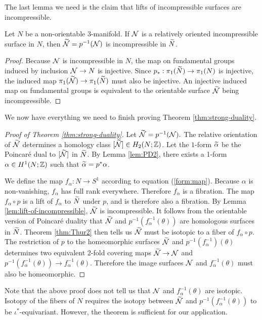 The last lemma we need is the claim that lifts of incompressible surfaces are incompressible.
\begin{lem}
  \label{lem:lift-of-incompressible}
  Let $N$ be a non-orientable 3-manifold.  If $\mathcal{N}$ is a relatively oriented incompressible surface in $N$, then $\widetilde{\mathcal{N}}=p^{-1}(\mathcal{N})$ is incompressible in $\widetilde{N}$.
\end{lem}
\begin{proof}
  Because $\mathcal{N}$ is incompressible in $N$, the map on fundamental groups induced by inclusion $\mathcal{N}\rightarrow N$ is injective.
  Since $p_\ast:\pi_1(\widetilde{N})\rightarrow\pi_1(N)$ is injective, the induced map $\pi_1(\widetilde{\mathcal{N}}) \to \pi_1(\widetilde{N})$ must also be injective.  An injective induced map on fundamental groups is equivalent to the orientable surface $\widetilde{\mathcal{N}}$ being incompressible.
\end{proof}


We now have everything we need to finish proving Theorem \ref{thm:strong-duality}.
\begin{proof}[Proof of Theorem \ref{thm:strong-duality}]
  Let $\widetilde{\mathcal{N}}=p^{-1}(\mathcal{N}).$
  The relative orientation of $\widetilde{\mathcal{N}}$ determines a homology class $[\widetilde{\mathcal{N}}]\in H_2(N;\mathbb{Z})$.  Let the $1$-form $\widetilde{\alpha}$ be the Poincar\'e dual to $[\widetilde{\mathcal{N}}]$ in $\widetilde{N}$.
  By Lemma \ref{lem:PD2}, there exists a 1-form $\alpha\in H^1(N;\mathbb{Z})$ such that $\widetilde{\alpha}=p^\ast\alpha$.

We define the map $f_\alpha:N\rightarrow S^1$ according to equation (\ref{form:map}).  Because $\alpha$ is non-vanishing, $f_{\alpha}$ has full rank everywhere.  Therefore $f_\alpha$ is a fibration.
The map $f_{\alpha} \circ p$ is a lift of $f_{\alpha}$ to $\widetilde{N}$ under $p$, and is therefore also a fibration.
  By Lemma \ref{lem:lift-of-incompressible}, $\widetilde{\mathcal{N}}$ is incompressible.
It follows from the orientable version of Poincar\'e duality that $\widetilde{\mathcal{N}}$ and $p^{-1}(f_{\alpha}^{-1}(\theta))$ are homologous surfaces in $\widetilde{N}$.    Theorem \ref{thm:Thur2} then tells us $\widetilde{\mathcal{N}}$ must be isotopic to a fiber of $f_{\alpha} \circ p$.
  The restriction of $p$ to the homeomorphic surfaces $\widetilde{\mathcal{N}}$ and $p^{-1}(f_{\alpha}^{-1})(\theta)$ determines two equivalent 2-fold covering maps $\widetilde{\mathcal{N}}\rightarrow \mathcal{N}$ and  $p^{-1}(f^{-1}_{\alpha}(\theta))\rightarrow f^{-1}_\alpha(\theta)$.  Therefore the image surfaces $\mathcal{N}$ and $f_{\alpha}^{-1}(\theta)$ must also be homeomorphic.
\end{proof}

  Note that the above proof does not tell us that $\mathcal{N}$ and $f_{\alpha}^{-1}(\theta)$ are isotopic.  Isotopy of the fibers of $N$ requires the isotopy between $\widetilde{\mathcal{N}}$ and $p^{-1}(f^{-1}_\alpha(\theta))$ to be $\iota^{\ast}$-equivariant.  However, the theorem is sufficient for our application.


